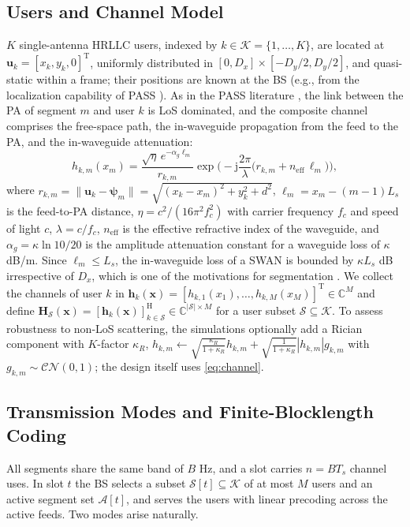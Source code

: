 \documentclass[journal]{IEEEtran}
\newcommand{\C}{\mathbb{C}}
\newcommand{\vect}[1]{\bm{#1}}
\newcommand{\Sset}{\mathcal{S}}
\newcommand{\Kset}{\mathcal{K}}
\newcommand{\neff}{n_{\mathrm{eff}}}
\begin{document}
\subsection{Users and Channel Model}
$K$ single-antenna HRLLC users, indexed by $k\in\Kset=\{1,\dots,K\}$, are located at $\vect{u}_k=[x_k,y_k,0]^{\mathrm T}$, uniformly distributed in $[0,D_x]\times[-D_y/2,D_y/2]$, and quasi-static within a frame; their positions are known at the BS (e.g., from the localization capability of PASS \cite{Shan2026SWANAccess}). As in the PASS literature \cite{Ding2025FlexibleAntenna,Ouyang2026SWAN}, the link between the PA of segment $m$ and user $k$ is LoS dominated, and the composite channel comprises the free-space path, the in-waveguide propagation from the feed to the PA, and the in-waveguide attenuation:
\begin{equation}\label{eq:channel}
h_{k,m}(x_m)=\frac{\sqrt{\eta}\,e^{-\alpha_g \ell_m}}{r_{k,m}}\exp\!\Big(-\mathrm j\frac{2\pi}{\lambda}\big(r_{k,m}+\neff\,\ell_m\big)\Big),
\end{equation}
where $r_{k,m}=\|\vect u_k-\vect\psi_m\|=\sqrt{(x_k-x_m)^2+y_k^2+d^2}$, $\ell_m=x_m-(m-1)L_s$ is the feed-to-PA distance, $\eta=c^2/(16\pi^2 f_c^2)$ with carrier frequency $f_c$ and speed of light $c$, $\lambda=c/f_c$, $\neff$ is the effective refractive index of the waveguide, and $\alpha_g=\kappa\ln 10/20$ is the amplitude attenuation constant for a waveguide loss of $\kappa$ dB/m. Since $\ell_m\le L_s$, the in-waveguide loss of a SWAN is bounded by $\kappa L_s$ dB irrespective of $D_x$, which is one of the motivations for segmentation \cite{Ouyang2026SWAN}. We collect the channels of user $k$ in $\vect h_k(\vect x)=[h_{k,1}(x_1),\dots,h_{k,M}(x_M)]^{\mathrm T}\in\C^{M}$ and define $\vect H_{\Sset}(\vect x)=[\vect h_k(\vect x)]_{k\in\Sset}^{\mathrm H}\in\C^{|\Sset|\times M}$ for a user subset $\Sset\subseteq\Kset$. To assess robustness to non-LoS scattering, the simulations optionally add a Rician component with $K$-factor $\kappa_R$, $h_{k,m}\leftarrow\sqrt{\tfrac{\kappa_R}{1+\kappa_R}}h_{k,m}+\sqrt{\tfrac{1}{1+\kappa_R}}|h_{k,m}|g_{k,m}$ with $g_{k,m}\sim\mathcal{CN}(0,1)$; the design itself uses \eqref{eq:channel}.

\subsection{Transmission Modes and Finite-Blocklength Coding}
All segments share the same band of $B$ Hz, and a slot carries $n=BT_s$ channel uses. In slot $t$ the BS selects a subset $\Sset[t]\subseteq\Kset$ of at most $M$ users and an active segment set $\mathcal A[t]$, and serves the users with linear precoding across the active feeds. Two modes arise naturally.
\end{document}
